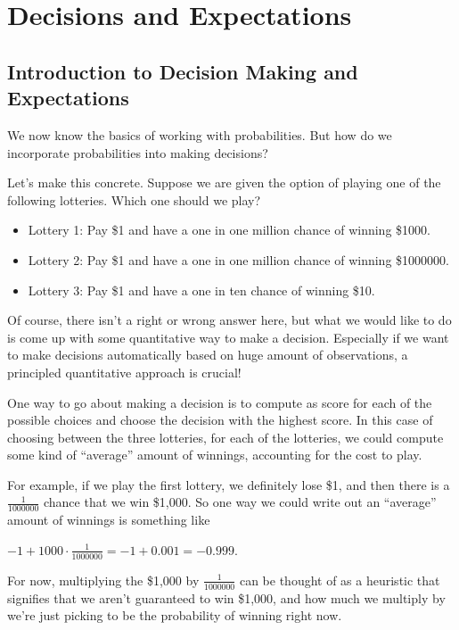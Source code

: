 \documentclass[6008notes.tex]{subfiles}
\begin{document}
\graphicspath{ {images/decisions/} }

\section{Decisions and Expectations}

\subsection{Introduction to Decision Making and Expectations}

We now know the basics of working with probabilities. But how do we incorporate probabilities into making decisions?

Let's make this concrete. Suppose we are given the option of playing one of the following lotteries. Which one should we play?

\begin{itemize}
\item Lottery 1: Pay \$1 and have a one in one million chance of winning \$1000.

\item Lottery 2: Pay \$1 and have a one in one million chance of winning \$1000000.

\item Lottery 3: Pay \$1 and have a one in ten chance of winning \$10.
\end{itemize}

Of course, there isn't a right or wrong answer here, but what we would like to do is come up with some quantitative way to make a decision. Especially if we want to make decisions automatically based on huge amount of observations, a principled quantitative approach is crucial!

One way to go about making a decision is to compute as score for each of the possible choices and choose the decision with the highest score. In this case of choosing between the three lotteries, for each of the lotteries, we could compute some kind of ``average'' amount of winnings, accounting for the cost to play.

For example, if we play the first lottery, we definitely lose \$1, and then there is a $\frac{1}{1000000}$ chance that we win \$1,000. So one way we could write out an ``average'' amount of winnings is something like

{\centering$-1+1000\cdot \frac{1}{1000000}=-1+0.001=-0.999.$ \par}
 
For now, multiplying the \$1,000 by $\frac{1}{1000000}$ can be thought of as a heuristic that signifies that we aren't guaranteed to win \$1,000, and how much we multiply by we're just picking to be the probability of winning right now.
\end{document}
